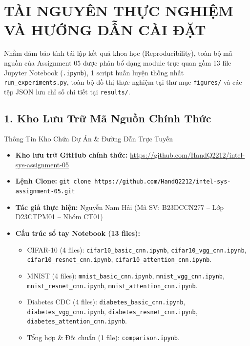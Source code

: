 \documentclass[12pt,a4paper]{article}
\begin{document}
\newpage

{}
\section*{TÀI NGUYÊN THỰC NGHIỆM VÀ HƯỚNG DẪN CÀI ĐẶT}

Nhằm đảm bảo tính tái lập kết quả khoa học (Reproducibility), toàn bộ mã nguồn của Assignment 05 được phân bổ dạng module trực quan gồm 13 file Jupyter Notebook (\texttt{.ipynb}), 1 script huấn luyện thống nhất \texttt{run\_experiments.py}, toàn bộ đồ thị thực nghiệm tại thư mục \texttt{figures/} và các tệp JSON lưu chỉ số chi tiết tại \texttt{results/}.

\subsection*{1. Kho Lưu Trữ Mã Nguồn Chính Thức}
\begin{mybox}{Thông Tin Kho Chứa Dự Án \& Đường Dẫn Trực Tuyến}
    \begin{itemize}[leftmargin=*]
        \item \textbf{Kho lưu trữ GitHub chính thức:} \href{https://github.com/HandQ2212/intel-sys-assignment-05}{\url{https://github.com/HandQ2212/intel-sys-assignment-05}} \cite{repo_github}
        \item \textbf{Lệnh Clone:} \texttt{git clone https://github.com/HandQ2212/intel-sys-assignment-05.git}
        \item \textbf{Tác giả thực hiện:} Nguyễn Nam Hải (Mã SV: B23DCCN277 -- Lớp D23CTPM01 -- Nhóm CT01)
        \item \textbf{Cấu trúc sổ tay Notebook (13 files):}
        \begin{itemize}
            \item CIFAR-10 (4 files): \texttt{cifar10\_basic\_cnn.ipynb}, \texttt{cifar10\_vgg\_cnn.ipynb}, \texttt{cifar10\_resnet\_cnn.ipynb}, \texttt{cifar10\_attention\_cnn.ipynb}.
            \item MNIST (4 files): \texttt{mnist\_basic\_cnn.ipynb}, \texttt{mnist\_vgg\_cnn.ipynb}, \texttt{mnist\_resnet\_cnn.ipynb}, \texttt{mnist\_attention\_cnn.ipynb}.
            \item Diabetes CDC (4 files): \texttt{diabetes\_basic\_cnn.ipynb}, \texttt{diabetes\_vgg\_cnn.ipynb}, \texttt{diabetes\_resnet\_cnn.ipynb}, \texttt{diabetes\_attention\_cnn.ipynb}.
            \item Tổng hợp \& Đối chuẩn (1 file): \texttt{comparison.ipynb}.
        \end{itemize}
    \end{itemize}
\end{mybox}
\end{document}
